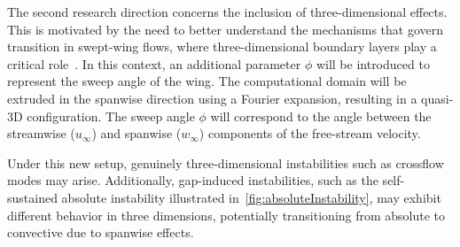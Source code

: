 \documentclass[../main.tex]{subfiles}
\begin{document}
The second research direction concerns the inclusion of three-dimensional effects. This is motivated by the need to better understand the mechanisms that govern transition in swept-wing flows, where three-dimensional boundary layers play a critical role~\cite{3dBoundaryLayers}. In this context, an additional parameter $\phi$ will be introduced to represent the sweep angle of the wing. The computational domain will be extruded in the spanwise direction using a Fourier expansion, resulting in a quasi-3D configuration. The sweep angle $\phi$ will correspond to the angle between the streamwise ($u_\infty$) and spanwise ($w_\infty$) components of the free-stream velocity.

Under this new setup, genuinely three-dimensional instabilities such as crossflow modes may arise. Additionally, gap-induced instabilities, such as the self-sustained absolute instability illustrated in~\cref{fig:absoluteInstability}, may exhibit different behavior in three dimensions, potentially transitioning from absolute to convective due to spanwise effects.
\end{document}
